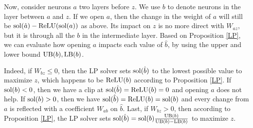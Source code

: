 % 			

\medskip

Now, consider neurons $a$ two layers before $z$. We use $b$ to denote neurons in the layer between $a$ and $z$. If we open $a$, then the change in the weight of $a$ will still be $\mathrm{sol}(\hat{a})-\mathrm{ReLU}(\mathrm{sol}(a))$ as above. Its impact on $z$ is no more direct with $W_{az}$, but it is through all the $b$ in the intermediate layer. 
Based on Proposition \ref{LP}, we can evaluate how opening $a$ impacts each value of 
$\hat{b}$,  by using the upper and lower bound
$\mathrm{UB}(b),\mathrm{LB}(b)$.

Indeed, if $W_{bz}\leq0$, then the LP solver sets $\mathrm{sol}(\hat{b})$ to the lowest possible value to maximize $z$, which happens to be $\mathrm{ReLU}(b)$ according to Proposition \ref{LP}.
If $\mathrm{sol}(b) < 0$, then we have a clip at $\mathrm{sol}(\hat{b})=\mathrm{ReLU}(b)=0$ and opening $a$ does not help. If $\mathrm{sol}(b) > 0$, then we have $\mathrm{sol}(\hat{b})=\mathrm{ReLU}(b)=\mathrm{sol}(b)$ and every change from 
$a$ is reflected with a coefficient $W_{ab}$ on $\hat{b}$. 
Last, if $W_{bz}>0$, then according to Proposition \ref{LP}, the LP solver
sets $\mathrm{sol}(\hat{b}) = \mathrm{sol}(b) \frac{\mathrm{UB}(b)}{\mathrm{UB}(b)-\mathrm{LB}(b)}$ to maximize $z$.


